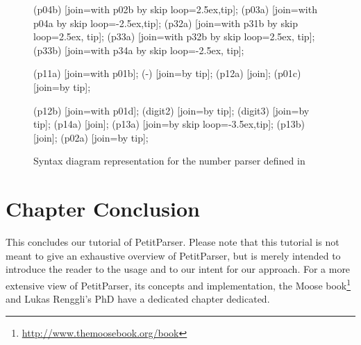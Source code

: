 \documentclass[a4paper,10pt,twoside]{book}
\begin{document}
\begin{figure}
{{    \chainin (p04b) [join=with p02b by {skip loop=2.5ex,tip}];
    \chainin (p03a) [join=with p04a by {skip loop=-2.5ex,tip}];
    \chainin (p32a) [join=with p31b by {skip loop=2.5ex, tip}];
    \chainin (p33a) [join=with p32b by {skip loop=2.5ex, tip}];
    \chainin (p33b) [join=with p34a by {skip loop=-2.5ex, tip}];

    \chainin (p11a) [join=with p01b];
    \chainin (-) [join=by tip];
    \chainin (p12a) [join];
    \chainin (p01c) [join=by tip];

    \chainin (p12b) [join=with p01d];
    \chainin (digit2) [join=by tip];
    \chainin (digit3) [join=by tip];
    \chainin (p14a) [join];
    \chainin (p13a) [join=by {skip loop=-3.5ex,tip}];
    \chainin (p13b) [join];
    \chainin (p02a) [join=by tip];
  }
}
  \caption{Syntax diagram representation for the number parser defined in }
  \label{fig:syntax-number}
\end{figure}
\section{Chapter Conclusion}

This concludes our tutorial of PetitParser. Please note that this
tutorial is not meant to give an exhaustive overview of PetitParser,
but is merely intended to introduce the reader to the usage and to our
intent for our approach. For a more extensive view of PetitParser, its
concepts and implementation, the Moose
book\footnote{\url{http://www.themoosebook.org/book}} and Lukas
Renggli's PhD have a dedicated chapter dedicated.

\ifx\wholebook\relax\else

\label{cha:glamour}


\end{document}
